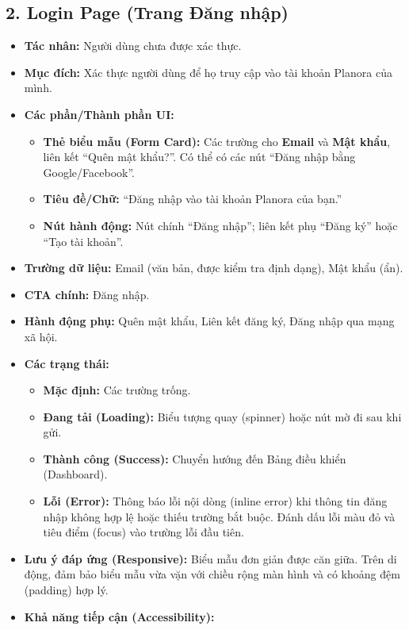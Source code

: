 \documentclass[11pt,a4paper]{article}
\begin{document}
\subsection{2. Login Page (Trang Đăng nhập)}
\begin{itemize}
    \item \textbf{Tác nhân:} Người dùng chưa được xác thực.
    \item \textbf{Mục đích:} Xác thực người dùng để họ truy cập vào tài khoản Planora của mình.
    \item \textbf{Các phần/Thành phần UI:}
    \begin{itemize}
        \item \textbf{Thẻ biểu mẫu (Form Card):} Các trường cho \textbf{Email} và \textbf{Mật khẩu}, liên kết ``Quên mật khẩu?''. Có thể có các nút ``Đăng nhập bằng Google/Facebook''.
        \item \textbf{Tiêu đề/Chữ:} ``Đăng nhập vào tài khoản Planora của bạn.''
        \item \textbf{Nút hành động:} Nút chính ``Đăng nhập''; liên kết phụ ``Đăng ký'' hoặc ``Tạo tài khoản''.
    \end{itemize}
    \item \textbf{Trường dữ liệu:} Email (văn bản, được kiểm tra định dạng), Mật khẩu (ẩn).
    \item \textbf{CTA chính:} Đăng nhập.
    \item \textbf{Hành động phụ:} Quên mật khẩu, Liên kết đăng ký, Đăng nhập qua mạng xã hội.
    \item \textbf{Các trạng thái:}
    \begin{itemize}
        \item \textbf{Mặc định:} Các trường trống.
        \item \textbf{Đang tải (Loading):} Biểu tượng quay (spinner) hoặc nút mờ đi sau khi gửi.
        \item \textbf{Thành công (Success):} Chuyển hướng đến Bảng điều khiển (Dashboard).
        \item \textbf{Lỗi (Error):} Thông báo lỗi nội dòng (inline error) khi thông tin đăng nhập không hợp lệ hoặc thiếu trường bắt buộc. Đánh dấu lỗi màu đỏ và tiêu điểm (focus) vào trường lỗi đầu tiên.
    \end{itemize}
    \item \textbf{Lưu ý đáp ứng (Responsive):} Biểu mẫu đơn giản được căn giữa. Trên di động, đảm bảo biểu mẫu vừa vặn với chiều rộng màn hình và có khoảng đệm (padding) hợp lý.
    \item \textbf{Khả năng tiếp cận (Accessibility):}

\end{itemize}
\end{document}
